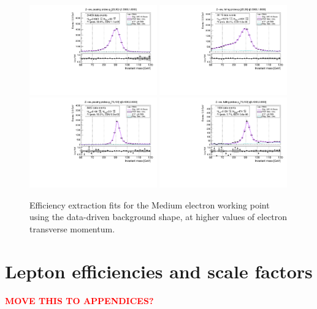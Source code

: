 {\begin{figure}
\centering
\includegraphics[width=0.49\textwidth]{figures/Zee_RecoTemplate_BkgLPiEMu_pass_ptBin3_etaBin23.pdf}
\includegraphics[width=0.49\textwidth]{figures/Zee_RecoTemplate_BkgLPiEMu_fail_ptBin3_etaBin23.pdf}
\includegraphics[width=0.49\textwidth]{figures/Zee_RecoTemplate_BkgLPiEMu_pass_ptBin14_etaBin17.pdf}
\includegraphics[width=0.49\textwidth]{figures/Zee_RecoTemplate_BkgLPiEMu_fail_ptBin14_etaBin17.pdf}
\caption{Efficiency extraction fits for the Medium electron working point using the data-driven background shape, at higher values of electron transverse momentum.}
\label{fig:ZeeNominalFits2}
\end{figure}

\section{Lepton efficiencies and scale factors}
\textcolor{red}{\bf{MOVE THIS TO APPENDICES?}}
}
